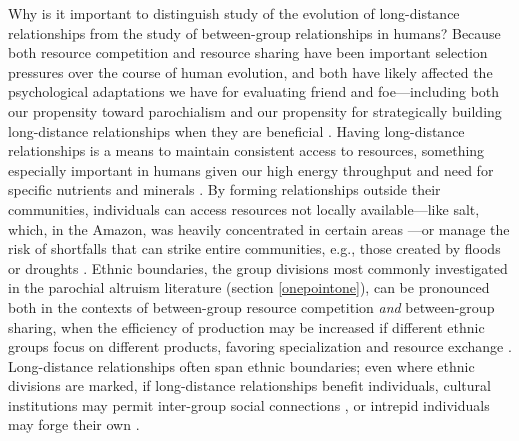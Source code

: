 \documentclass[bibauthoryear]{aa}
\begin{document}
Why is it important to distinguish study of the evolution of long-distance relationships from the study of between-group relationships in humans? Because both resource competition and resource sharing have been important selection pressures over the course of human evolution, and both have likely affected the psychological adaptations we have for evaluating friend and foe---including both our propensity toward parochialism \citep{moya2015different} and our propensity for strategically building long-distance relationships when they are beneficial \citep{pisor2019evolution, pisorjones2020}. Having long-distance relationships is a means to maintain consistent access to resources, something especially important in humans given our high energy throughput and need for specific nutrients and minerals \citep{pisor2019evolution}. By forming relationships outside their communities, individuals can access resources not locally available---like salt, which, in the Amazon, was heavily concentrated in certain areas \citep{reeve1993regional}---or manage the risk of shortfalls that can strike entire communities, e.g., those created by floods or droughts \citep{pisor2019evolution, pisorjones2020}. Ethnic boundaries, the group divisions most commonly investigated in the parochial altruism literature (section \ref{onepointone}), can be pronounced both in the contexts of between-group resource competition \citep{choi2007coevolution, bellmoya} \textit{and} between-group sharing, when the efficiency of production may be increased if different ethnic groups focus on different products, favoring specialization and resource exchange \citep{barth1956ecologic, brewer1976ethnocentrism, bowles2004persistent, moya2015different}. Long-distance relationships often span ethnic boundaries; even where ethnic divisions are marked, if long-distance relationships benefit individuals, cultural institutions may permit inter-group social connections \citep{bollig2010risk}, or intrepid individuals may forge their own \citep{pisor2019evolution, schaub2017threat}.
\end{document}
